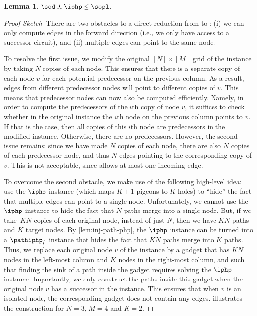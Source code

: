 \documentclass[10pt,a4paper]{article}
\theoremstyle{definition}
\theoremstyle{plain}
\newtheorem{lemma}{Lemma}
\theoremstyle{remark}
\begin{document}
\begin{lemma}
$\sod\curlywedge\iphp \leq \sopl$.
\label{lem:iphp_or_iter_reduces_to_sopl}
\end{lemma}

\begin{proof}[Proof Sketch]
There are two obstacles to a direct reduction from \sod to \sopl: (i) we can only compute edges in the forward direction (i.e., we only have access to a successor circuit), and (ii) multiple edges can point to the same node.

To resolve the first issue, we modify the original $[N] \times [M]$ grid of the \sod instance by taking $N$ copies of each node. This ensures that there is a separate copy of each node $v$ for each potential predecessor on the previous column. As a result, edges from different predecessor nodes will point to different copies of $v$. This means that predecessor nodes can now also be computed efficiently. Namely, in order to compute the predecessors of the $i$th copy of node $v$, it suffices to check whether in the original \sod instance the $i$th node on the previous column points to $v$. If that is the case, then all copies of this $i$th node are predecessors in the modified instance. Otherwise, there are no predecessors. However, the second issue remains: since we have made $N$ copies of each node, there are also $N$ copies of each predecessor node, and thus $N$ edges pointing to the corresponding copy of $v$. This is not acceptable, since \sopl allows at most one incoming edge.

To overcome the second obstacle, we make use of the following high-level idea: use the $\iphp$ instance (which maps $K+1$ pigeons to $K$ holes) to ``hide'' the fact that multiple edges can point to a single node. Unfortunately, we cannot use the $\iphp$ instance to hide the fact that $N$ paths merge into a single node. But, if we take~$K N$ copies of each original node, instead of just $N$, then we have $KN$ paths and $K$ target nodes. By \cref{lem:inj-path-php}, the $\iphp$ instance can be turned into a $\pathiphp_f$ instance that hides the fact that $KN$ paths merge into $K$ paths. Thus, we replace each original node $v$ of the \sod instance by a gadget that has $KN$ nodes in the left-most column and $K$ nodes in the right-most column, and such that finding the sink of a path inside the gadget requires solving the $\iphp$ instance. Importantly, we only construct the paths inside this gadget when the original node $v$ has a successor in the \sod instance. This ensures that when $v$ is an isolated node, the corresponding gadget does not contain any edges.  illustrates the construction for $N=3$, $M=4$ and $K=2$.


\end{proof}
\end{document}

